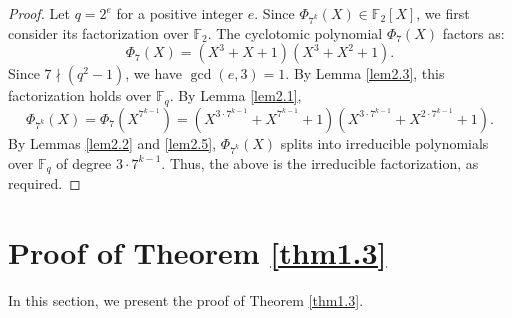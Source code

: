 \documentclass[10pt,reqno]{amsart}
\theoremstyle{definition}
\theoremstyle{remark}
\numberwithin{equation}{section}
\begin{document}
\begin{proof}
Let $q = 2^e$ for a positive integer $e$. Since $\Phi_{7^k}(X) \in \mathbb{F}_2[X]$, we first consider its factorization over $\mathbb{F}_2$. The cyclotomic polynomial $\Phi_7(X)$ factors as:
\[
\Phi_7(X) = (X^3 + X + 1)(X^3 + X^2 + 1).
\]
Since $7 \nmid (q^2 - 1)$, we have $\gcd(e, 3) = 1$. By Lemma \ref{lem2.3}, this factorization holds over $\mathbb{F}_q$. By Lemma \ref{lem2.1},
\[
\Phi_{7^k}(X) = \Phi_7(X^{7^{k-1}}) = (X^{3 \cdot 7^{k-1}} + X^{7^{k-1}} + 1)(X^{3 \cdot 7^{k-1}} + X^{2 \cdot 7^{k-1}} + 1).
\]
By Lemmas \ref{lem2.2} and \ref{lem2.5}, $\Phi_{7^k}(X)$ splits into irreducible polynomials over $\mathbb{F}_q$ of degree $3 \cdot 7^{k-1}$. Thus, the above is the irreducible factorization, as required.
\end{proof}

\section{Proof of Theorem \ref{thm1.3}}

In this section, we present the proof of Theorem \ref{thm1.3}.
\end{document}
